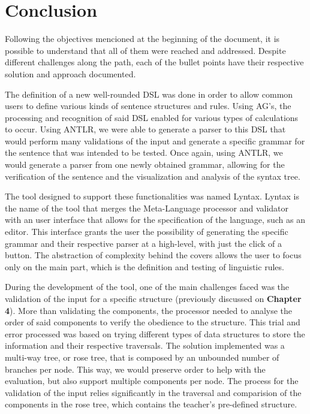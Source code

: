 \chapter{Conclusion} \label{conclusion}

Following the objectives mencioned at the beginning of the document, it is possible to understand that all of them were reached and addressed.
Despite different challenges along the path, each of the bullet points have their respective solution and approach documented.

The definition of a new well-rounded DSL was done in order to allow common users to define various kinds of sentence structures and rules.
Using AG's, the processing and recognition of said DSL enabled for various types of calculations to occur.
Using ANTLR, we were able to generate a parser to this DSL that would perform many validations of the input and generate a specific grammar for the sentence that was
intended to be tested.
Once again, using ANTLR, we would generate a parser from one newly obtained grammar, allowing for the verification of the sentence and the visualization and analysis
of the syntax tree.

The tool designed to support these functionalities was named Lyntax. Lyntax is the name of the tool that merges the Meta-Language processor and validator with an
user interface that allows for the specification of the language, such as an editor.
This interface grants the user the possibility of generating the specific grammar and their respective parser at a high-level, with just the click of a button.
The abstraction of complexity behind the covers allows the user to focus only on the main part, which is the definition and testing of linguistic rules.

During the development of the tool, one of the main challenges faced was the validation of the input for a specific structure (previously discussed on \textbf{Chapter 4}).
More than validating the components, the processor needed to analyse the order of said components to verify the obedience to the structure.
This trial and error processed was based on trying different types of data structures to store the information and their respective traversals.
The solution implemented was a multi-way tree, or rose tree, that is composed by an unbounded number of branches per node.
This way, we would preserve order to help with the evaluation, but also support multiple components per node.
The process for the validation of the input relies significantly in the traversal and comparision of the components in the rose tree, 
which contains the teacher's pre-defined structure. 


